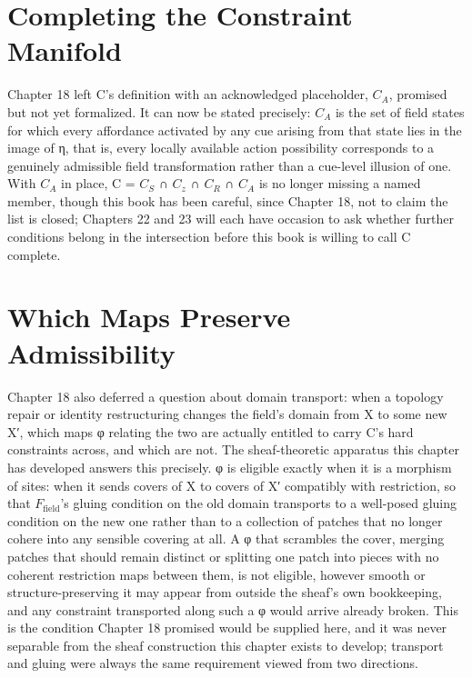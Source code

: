 \section{Completing the Constraint Manifold}

Chapter 18 left C's definition with an acknowledged placeholder, \(C_A\), promised but not yet formalized. It can now be stated precisely: \(C_A\) is the set of field states for which every affordance activated by any cue arising from that state lies in the image of η, that is, every locally available action possibility corresponds to a genuinely admissible field transformation rather than a cue-level illusion of one. With \(C_A\) in place, C = \(C_S\) ∩ \(C_z\) ∩ \(C_R\) ∩ \(C_A\) is no longer missing a named member, though this book has been careful, since Chapter 18, not to claim the list is closed; Chapters 22 and 23 will each have occasion to ask whether further conditions belong in the intersection before this book is willing to call C complete.

\section{Which Maps Preserve Admissibility}

Chapter 18 also deferred a question about domain transport: when a topology repair or identity restructuring changes the field's domain from X to some new X′, which maps φ relating the two are actually entitled to carry C's hard constraints across, and which are not. The sheaf-theoretic apparatus this chapter has developed answers this precisely. φ is eligible exactly when it is a morphism of sites: when it sends covers of X to covers of X′ compatibly with restriction, so that \(F_{\mathrm{field}}\)'s gluing condition on the old domain transports to a well-posed gluing condition on the new one rather than to a collection of patches that no longer cohere into any sensible covering at all. A φ that scrambles the cover, merging patches that should remain distinct or splitting one patch into pieces with no coherent restriction maps between them, is not eligible, however smooth or structure-preserving it may appear from outside the sheaf's own bookkeeping, and any constraint transported along such a φ would arrive already broken. This is the condition Chapter 18 promised would be supplied here, and it was never separable from the sheaf construction this chapter exists to develop; transport and gluing were always the same requirement viewed from two directions.

